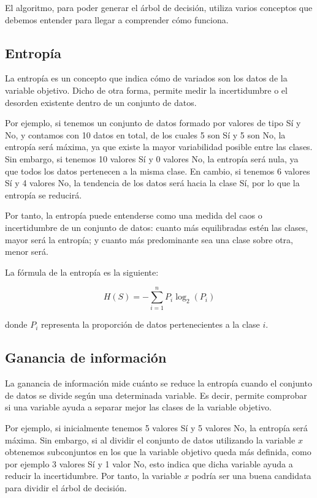 El algoritmo, para poder generar el árbol de decisión, utiliza varios conceptos que debemos entender para llegar a comprender cómo funciona.

\subsection{\textbf{Entropía}}

La entropía \cite{entropy_dash} es un concepto que indica cómo de variados son los datos de la variable objetivo. Dicho de otra forma, permite medir la incertidumbre o el desorden existente dentro de un conjunto de datos.

Por ejemplo, si tenemos un conjunto de datos formado por valores de tipo Sí y No, y contamos con 10 datos en total, de los cuales 5 son Sí y 5 son No, la entropía será máxima, ya que existe la mayor variabilidad posible entre las clases. Sin embargo, si tenemos 10 valores Sí y 0 valores No, la entropía será nula, ya que todos los datos pertenecen a la misma clase. En cambio, si tenemos 6 valores Sí y 4 valores No, la tendencia de los datos será hacia la clase Sí, por lo que la entropía se reducirá.

Por tanto, la entropía puede entenderse como una medida del caos o incertidumbre de un conjunto de datos: cuanto más equilibradas estén las clases, mayor será la entropía; y cuanto más predominante sea una clase sobre otra, menor será.

La fórmula de la entropía es la siguiente:

\begin{equation}
H(S) = - \sum_{i=1}^{n} P_i \log_2 \left( P_i \right)
\label{eq:entropy}
\end{equation}

donde $P_i$ representa la proporción de datos pertenecientes a la clase $i$.

\subsection{\textbf{Ganancia de información}}

La ganancia de información \cite{1996ContinuousC45} mide cuánto se reduce la entropía cuando el conjunto de datos se divide según una determinada variable. Es decir, permite comprobar si una variable ayuda a separar mejor las clases de la variable objetivo.

Por ejemplo, si inicialmente tenemos 5 valores Sí y 5 valores No, la entropía será máxima. Sin embargo, si al dividir el conjunto de datos utilizando la variable $x$ obtenemos subconjuntos en los que la variable objetivo queda más definida, como por ejemplo 3 valores Sí y 1 valor No, esto indica que dicha variable ayuda a reducir la incertidumbre. Por tanto, la variable $x$ podría ser una buena candidata para dividir el árbol de decisión.

